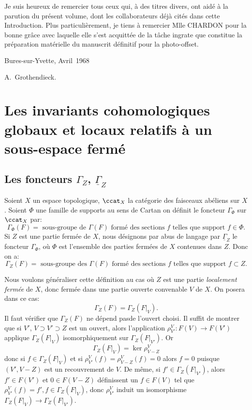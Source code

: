 Je suis heureux de remercier tous ceux qui, \`a des titres divers, ont aid\'e \`a la parution du pr\'esent volume, dont les collaborateurs d\'ej\`a cit\'es dans cette Introduction. Plus particuli\`erement, je tiens \`a remercier Mlle CHARDON pour la bonne gr\^ace avec laquelle elle s'est acquitt\'ee de la t\^ache ingrate que constitue la pr\'eparation mat\'erielle du manuscrit d\'efinitif pour la photo-offset.

\bigskip\hfill Bures-sur-Yvette, Avril~1968
\par\smallskip \hfill A.\, Grothendieck.

\chapter[Les invariants cohomologiques globaux et locaux]
{Les invariants cohomologiques globaux et locaux relatifs \`a un sous-espace ferm\'e} \label{I}

\section{Les foncteurs $\Gamma_Z$, $\underline{\Gamma}_Z$} \label{I.1}
Soient $X$ un espace topologique, $\ccat_X$ la cat\'egorie des faisceaux ab\'eliens sur $X$. Soient $\Phi$ une famille de supports au sens de Cartan on d\'efinit le foncteur $\Gamma_\Phi$ sur $\ccat_X$ par:
\begin{equation} \label{eq:I.1} { \Gamma_\Phi(F) = \text{ sous-groupe de } \Gamma(F) \text{ formé des sections } f \text{ telles que support } f \in \Phi}.
\end{equation}
Si $Z$ est une partie ferm\'ee de $X$, nous d\'esignons par abus de langage par $\underline{\Gamma}_Z$ le foncteur $\Gamma_\Phi$, o\`u $\Phi$ est l'ensemble des parties ferm\'ees de $X$ contenues dans $Z$. Donc on a:
\begin{equation} \label{eq:I.2}
{\Gamma_Z(F) = \text{ sous-groupe des } \Gamma(F) \text{ formé des sections } f \text{ telles que support } f \subset Z}.
\end{equation}

Nous voulons g\'en\'eraliser cette d\'efinition au cas o\`u $Z$ est une partie \textit{localement fermée} de $X$, donc ferm\'ee dans une partie ouverte convenable $V$ de $X$. On posera dans ce cas:
\begin{equation} \label{eq:I.3} {\Gamma_Z(F)=\Gamma_Z(F|_{V})}.
\end{equation}
Il faut v\'erifier que $\Gamma_Z(F)$ \og ne d\'epend pas\fg de l'ouvert choisi. Il suffit de montrer que si $V'$, $V\supset V' \supset Z$ est un ouvert, alors l'application $\rho_{V'}^V: F(V) \to F(V')$ applique $\Gamma_Z(F|_{V})$ isomorphiquement sur $\Gamma_Z(F|_{V'})$. Or
\begin{equation} \label{eq:I.4} { \Gamma_Z(F|_{V}) = \ker \rho_{V-Z}^V}
\end{equation}
donc si $f\in \Gamma_Z(F|_{V})$ et si $\rho_{V'}^V(f)=\rho_{V-Z}^V(f)=0$ alors $f=0$ puisque $(V', V-Z)$ est un recouvrement de $V$. De m\^eme, si $f'\in \Gamma_Z(F|_{V'})$, alors $f'\in F(V')$ et $0\in F(V-Z)$ d\'efinissent un $f\in F(V)$ tel que $\rho_{V'}^V(f)=f', f\in \Gamma_Z(F|_{V})$, donc $\rho_{V'}^V$ induit un isomorphisme $\Gamma_Z(F|_{V}) \to \Gamma_Z(F|_{V'})$.

